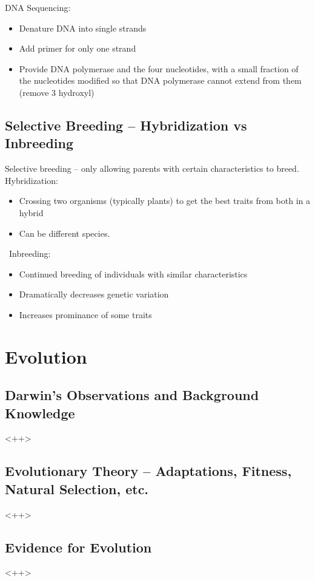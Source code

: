 \documentclass{article}
\begin{document}
DNA Sequencing:
\begin{itemize}
\item Denature DNA into single strands
\item Add primer for only one strand
\item Provide DNA polymerase and the four nucleotides, with a small fraction of the nucleotides modified so that DNA polymerase cannot extend from them (remove 3 hydroxyl)
\end{itemize}

\subsection{Selective Breeding -- Hybridization vs Inbreeding}

Selective breeding -- only allowing parents with certain characteristics to breed.\\
Hybridization:
\begin{itemize}
\item Crossing two organisms (typically plants) to get the best traits from both in a hybrid
\item Can be different species.
\end{itemize}\
Inbreeding:
\begin{itemize}
\item Continued breeding of individuals with similar characteristics
\item Dramatically decreases genetic variation
\item Increases prominance of some traits
\end{itemize}

\section{Evolution} %

\subsection{Darwin's Observations and Background Knowledge}
<++>

\subsection{Evolutionary Theory -- Adaptations, Fitness, Natural Selection, etc.}
<++>

\subsection{Evidence for Evolution}
<++>
\end{document}
